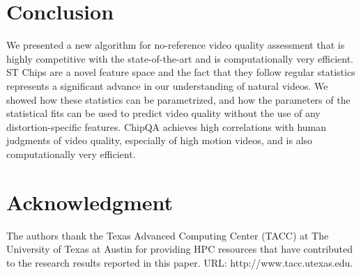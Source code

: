 \documentclass[journal]{IEEEtran}
\begin{document}
\section{Conclusion}
We presented a new algorithm for no-reference video quality assessment that is highly competitive with the state-of-the-art and is computationally very efficient. ST Chips are a novel feature space and the fact that they follow regular statistics represents a significant advance in our understanding of natural videos. We showed how these statistics can be parametrized, and how the parameters of the statistical fits can be used to predict video quality without the use of any distortion-specific features. ChipQA achieves high correlations with human judgments of video quality, especially of high motion videos, and is also computationally very efficient. 







\section*{Acknowledgment}

The authors thank the Texas Advanced Computing Center (TACC) at The University of Texas at Austin for providing HPC resources that have contributed to the research results reported in this paper. URL: http://www.tacc.utexas.edu.

\ifCLASSOPTIONcaptionsoff
  \newpage
\fi









\end{document}
